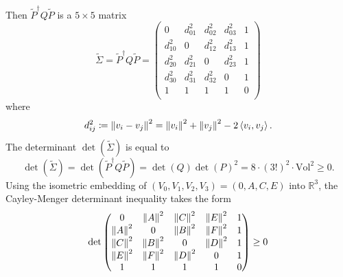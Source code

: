 \documentclass[notitlepage, 10pt]{article}
\begin{document}
Then $\tilde P^{\dagger} Q \tilde P$ is a $5\times 5$ matrix
\begin{equation}
    \tilde \Sigma=
    \tilde P^{\dagger} Q \tilde P = \begin{pmatrix}
        0 & d_{01}^2 & d_{02}^2 & d_{03}^2 & 1 \\
        d_{10}^2 & 0 & d_{12}^2 & d_{13}^2 & 1 \\
        d_{20}^2 & d_{21}^2 & 0 & d_{23}^2 & 1 \\
        d_{30}^2 & d_{31}^2 & d_{32}^2 & 0 & 1 \\
        1 & 1 & 1 & 1 & 0 \\
    \end{pmatrix}
\end{equation}
where 
\begin{equation}
    d_{ij}^2 \coloneqq \left\lVert v_i - v_j\right\rVert^{2} = \left\lVert v_i\right\rVert^{2} +\left\lVert v_j\right\rVert^{2} - 2 \braket{v_i, v_j}.
\end{equation}
The determinant $\det(\tilde \Sigma)$ is equal to
\begin{equation}
    \det(\tilde \Sigma) = \det(\tilde P^{\dagger} Q \tilde P) = \det(Q) \det(P)^2 = 8 \cdot (3!)^2 \cdot \mathrm{Vol}^2 \geq 0.
\end{equation}
Using the isometric embedding of $(V_0,V_1,V_2,V_3) = (0,A,C,E)$ into $\mathbb R^3$, the Cayley-Menger determinant inequality takes the form 
\begin{equation}
    \det
    \begin{pmatrix}
        0 & \left\lVert A\right\rVert^2 & \left\lVert C\right\rVert^{2} & \left\lVert E\right\rVert^2 & 1 \\
        \left\lVert A\right\rVert^2 & 0 & \left\lVert B\right\rVert^{2} & \left\lVert F\right\rVert^2 & 1\\
        \left\lVert C\right\rVert^2 & \left\lVert B\right\rVert^2 & 0 & \left\lVert D\right\rVert^2 & 1 \\
        \left\lVert E\right\rVert^2 & \left\lVert F\right\rVert^2 & \left\lVert D\right\rVert^2 & 0 & 1 \\
        1 & 1 & 1 & 1 & 0 \\
    \end{pmatrix}
    \geq 0
\end{equation}

\clearpage
\printbibliography
\end{document}
